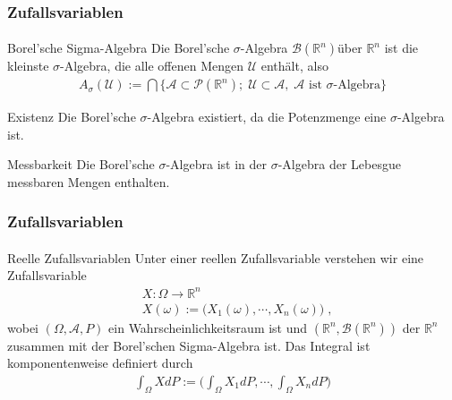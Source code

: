 \documentclass{beamer}
\begin{document}
\begin{frame}
    \frametitle{Zufallsvariablen}
\framesubtitle{}

\begin{block}{Borel'sche Sigma-Algebra}
Die Borel'sche   $\sigma$-Algebra $\mathcal{B}(\mathbb{R}^n)$über $\mathbb{R}^n$ ist die kleinste  $\sigma$-Algebra, die alle offenen Mengen $\mathcal{U}$ enthält, also 
\begin{align*}
A_\sigma (\mathcal{U}) := \bigcap \{  \mathcal{A} \subset \mathcal{P}(\mathbb{R}^n);  \;   \mathcal{U}  \subset  \mathcal{A},  \;  \mathcal{A} \text{ ist $\sigma$-Algebra} \}
\end{align*}
\end{block}

\begin{block}{Existenz}
Die Borel'sche   $\sigma$-Algebra existiert, da die Potenzmenge eine   $\sigma$-Algebra ist.
\end{block}

\begin{block}{Messbarkeit}
Die Borel'sche   $\sigma$-Algebra ist in der $\sigma$-Algebra der Lebesgue messbaren Mengen enthalten.
\end{block}
 \end{frame}





\begin{frame}
    \frametitle{Zufallsvariablen}
\framesubtitle{}

\begin{block}{Reelle Zufallsvariablen}
Unter einer reellen Zufallsvariable verstehen wir eine Zufallsvariable 
\begin{align*}
& X : \Omega \to \mathbb{R}^n \\
& X(\omega) := \biggl(X_1(\omega), \cdots , X_n(\omega)  \biggr) \; ,
\end{align*}
wobei $(\Omega, \mathcal{A}, P)$ ein Wahrscheinlichkeitsraum ist und $(\mathbb{R}^n, \mathcal{B}(\mathbb{R}^n))$ der $\mathbb{R}^n$ zusammen mit der Borel'schen Sigma-Algebra ist. Das Integral ist komponentenweise definiert durch
\begin{align*} 
\int_{\Omega} X dP :=  \biggl( \int_{\Omega} X_1 dP, \cdots , \int_{\Omega} X_n dP    \biggr)
\end{align*}

\end{block}

 \end{frame}
\end{document}
